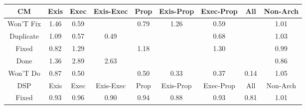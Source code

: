 \begin{tabular}{|c||c|c|c|c|c|c|c|c|}
\hline
\hline
CM & Exis & Exec & Exis-Exec & Prop & Exis-Prop & Exec-Prop & All & Non-Arch \\ 
\hline
Won'T Fix & \cellcolor[rgb]{0.8667597976541501,0.8195177988888079,0.42} 1.46 & \cellcolor[rgb]{0.8372996316700723,0.49588492323834177,0.3521463228920674} 0.59 &  & \cellcolor[rgb]{0.8724780948937583,0.662396315830456,0.3849795552341744} 0.79 & \cellcolor[rgb]{0.8859392166751353,0.8286027868461167,0.42} 1.26 & \cellcolor[rgb]{0.838745189162847,0.5027272287041425,0.35349550988532386} 0.59 &  & \cellcolor[rgb]{0.9092783914242349,0.8396581854114796,0.42} 1.01 \\ 
\hline
Duplicate & \cellcolor[rgb]{0.9013959044602124,0.8359243757969427,0.42} 1.09 & \cellcolor[rgb]{0.8354961792478849,0.4873485817733217,0.3504631006313592} 0.57 & \cellcolor[rgb]{0.8197774573924262,0.4129466316574841,0.3357922935662645} 0.49 &  &  & \cellcolor[rgb]{0.8536546097966325,0.5732984863707272,0.36741096914352367} 0.68 &  & \cellcolor[rgb]{0.9076270263639894,0.8388759598566266,0.42} 1.03 \\ 
\hline
Fixed & \cellcolor[rgb]{0.8788216084615168,0.6924222800511791,0.3909001678974156} 0.82 & \cellcolor[rgb]{0.8828698096808087,0.8271488572172251,0.42} 1.29 &  & \cellcolor[rgb]{0.8930787480281873,0.831984670118615,0.42} 1.18 &  & \cellcolor[rgb]{0.881923319420684,0.8267005197255872,0.42} 1.30 &  & \cellcolor[rgb]{0.9077946307360883,0.8295612521508182,0.41794165535368244} 0.99 \\ 
\hline
Done & \cellcolor[rgb]{0.876347360363812,0.8240592759618056,0.42} 1.36 & \cellcolor[rgb]{0.7319417561087818,0.7556566213146861,0.42} 2.89 & \cellcolor[rgb]{0.7561484903139267,0.7671229690960705,0.42} 2.63 &  &  &  &  & \cellcolor[rgb]{0.8856090333564653,0.7245494245539357,0.3972350977993676} 0.86 \\ 
\hline
Won'T Do & \cellcolor[rgb]{0.8874083223983701,0.733066059352285,0.3989144342384787} 0.87 & \cellcolor[rgb]{0.8232297327938478,0.4292874018908794,0.33901441727425796} 0.50 &  & \cellcolor[rgb]{0.8216269788869774,0.42170103339835946,0.3375185136278456} 0.50 & \cellcolor[rgb]{0.7932570200166212,0.28741656141200705,0.31103988534884647} 0.33 & \cellcolor[rgb]{0.7991232916988404,0.31518358070784436,0.316515072252251} 0.37 & \cellcolor[rgb]{0.76,0.13,0.28} 0.14 & \cellcolor[rgb]{0.9056784211967301,0.8379529363563458,0.42} 1.05 \\ 
\hline
\hline
DSP & Exis & Exec & Exis-Exec & Prop & Exis-Prop & Exec-Prop & All & Non-Arch \\ 
\hline
Fixed & \cellcolor[rgb]{0.897470491744987,0.7806936609262721,0.4083057922953212} 0.93 & \cellcolor[rgb]{0.9025196881470695,0.8045931905627954,0.41301837560393145} 0.96 & \cellcolor[rgb]{0.8928366086556196,0.7587599476365996,0.403980834745245} 0.90 & \cellcolor[rgb]{0.8991283922895712,0.7885410568373038,0.4098531661369331} 0.94 & \cellcolor[rgb]{0.8888886272813061,0.7400728357981822,0.400296052129219} 0.88 & \cellcolor[rgb]{0.8972448848906437,0.7796257884823801,0.4080952258979341} 0.93 & \cellcolor[rgb]{0.8765493593499829,0.6816669675899192,0.38877940205998407} 0.81 & \cellcolor[rgb]{0.909035653982078,0.8395432045178264,0.42} 1.01 \\ 

\end{tabular}
